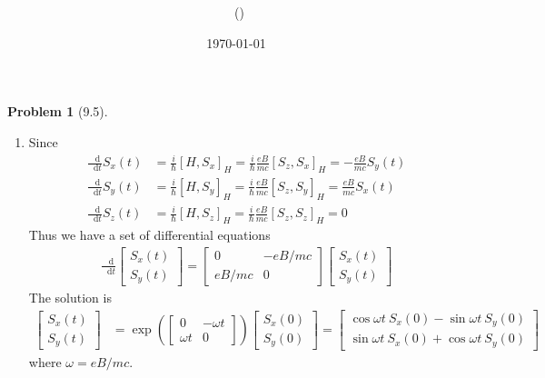 \documentclass[twoside,11pt]{article}
\title{{\lms \Code \ \Ass}}
\author{\lms \name \ (\href{mailto:\mail}{\mail})}
\date{\sffamily \today}
\makeatletter
\renewcommand*\d{\mathop{}\!\mathrm{d}}
\theoremstyle{definition}
\newtheorem{problem}{Problem}
\theoremstyle{remark}
\newtheorem*{remark}{Remark}
\renewcommand{\maketitle}{\bgroup\setlength{\parindent}{0pt}
\begin{flushleft}
  \textbf{\Large\@title}

  \@author
\end{flushleft}\egroup
}
\makeatother
\begin{document}
\maketitle
\thispagestyle{title}


\begin{problem}[9.5]\
\begin{enumerate}[label=(\alph*)]
\item Since
\begin{align*}
    \frac{\d}{\d t}S_x(t) &= \frac{i}{\hbar}[H, S_x]_H
    = \frac{i}{\hbar}\frac{eB}{mc}[S_z, S_x]_H
    = -\frac{eB}{mc}S_y(t)\\
    \frac{\d}{\d t}S_y(t) &= \frac{i}{\hbar}[H, S_y]_H
    = \frac{i}{\hbar}\frac{eB}{mc}[S_z, S_y]_H
    = \frac{eB}{mc}S_x(t)\\
    \frac{\d}{\d t}S_z(t) &= \frac{i}{\hbar}[H, S_z]_H
    = \frac{i}{\hbar}\frac{eB}{mc}[S_z, S_z]_H
    = 0
\end{align*}
Thus we have a set of differential equations
\begin{align*}
    \frac{\d}{\d t}
    \begin{bmatrix}
        S_x(t) \\ S_y(t)
    \end{bmatrix}
    = \begin{bmatrix}
        0 & -eB/mc \\ eB/mc & 0
    \end{bmatrix}
    \begin{bmatrix}
        S_x(t) \\ S_y(t)
    \end{bmatrix}
\end{align*}
The solution is
\begin{align*}
    \begin{bmatrix}
        S_x(t)\\ S_y(t)
    \end{bmatrix} &= 
    \exp\left(
    \begin{bmatrix}
        0 & -\omega t \\ \omega t& 0
    \end{bmatrix}\right)
    \begin{bmatrix}
        S_x(0) \\ S_y(0)
    \end{bmatrix}
    = \begin{bmatrix}
        \cos\omega t\ S_x(0) - \sin\omega t\ S_y(0)\\
        \sin\omega t\ S_x(0) + \cos\omega t\ S_y(0)
    \end{bmatrix}
\end{align*}
where $\omega = eB/mc$.


\end{enumerate}
\end{problem}
\end{document}
